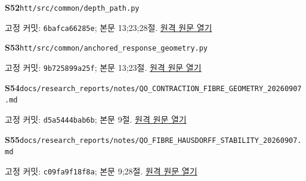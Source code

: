 \documentclass[11pt,a4paper]{article}
\begin{document}
\hypertarget{src:S52}{}\textbf{S52}\quad \nolinkurl{htt/src/common/depth_path.py}\par
{\small 고정 커밋: \texttt{6bafca66285e}; 본문 13;23;28절. \href{https://github.com/cosmosapjw-quantum/htt_base/blob/6bafca66285ef071081453313bb7d2d6b261599c/htt/src/common/depth_path.py}{원격 원문 열기}}\par
\hypertarget{src:S53}{}\textbf{S53}\quad \nolinkurl{htt/src/common/anchored_response_geometry.py}\par
{\small 고정 커밋: \texttt{9b725899a25f}; 본문 13;23절. \href{https://github.com/cosmosapjw-quantum/htt_base/blob/9b725899a25fa410e7c3686ce36afaa667d14646/htt/src/common/anchored_response_geometry.py}{원격 원문 열기}}\par
\hypertarget{src:S54}{}\textbf{S54}\quad \nolinkurl{docs/research_reports/notes/QO_CONTRACTION_FIBRE_GEOMETRY_20260907.md}\par
{\small 고정 커밋: \texttt{d5a5444bab6b}; 본문 9절. \href{https://github.com/cosmosapjw-quantum/htt_base/blob/d5a5444bab6be7dcc79e362a52811882dd0a66a3/docs/research_reports/notes/QO_CONTRACTION_FIBRE_GEOMETRY_20260907.md}{원격 원문 열기}}\par
\hypertarget{src:S55}{}\textbf{S55}\quad \nolinkurl{docs/research_reports/notes/QO_FIBRE_HAUSDORFF_STABILITY_20260907.md}\par
{\small 고정 커밋: \texttt{c09fa9f18f8a}; 본문 9;28절. \href{https://github.com/cosmosapjw-quantum/htt_base/blob/c09fa9f18f8a6c997f4d7420088653e1cb9af042/docs/research_reports/notes/QO_FIBRE_HAUSDORFF_STABILITY_20260907.md}{원격 원문 열기}}\par
\end{document}
